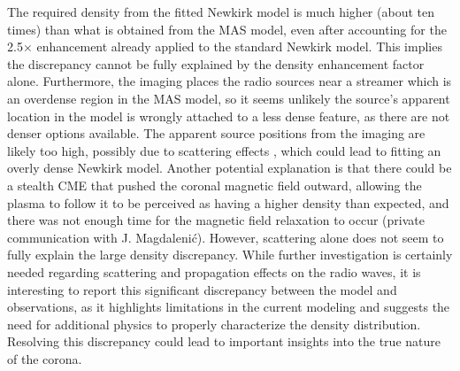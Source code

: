 The required density from the fitted Newkirk model is much higher (about ten times) than what is obtained from the MAS model, even after accounting for the 2.5$\times$ enhancement already applied to the standard Newkirk model. This implies the discrepancy cannot be fully explained by the density enhancement factor alone. Furthermore, the imaging places the radio sources near a streamer which is an overdense region in the MAS model, so it seems unlikely the source's apparent location in the model is wrongly attached to a less dense feature, as there are not denser options available.
The apparent source positions from the imaging are likely too high, possibly due to scattering effects \citep{kontar_2019, kontar_2023, chen_2023}, which could lead to fitting an overly dense Newkirk model. Another potential explanation is that there could be a stealth CME that pushed the coronal magnetic field outward, allowing the plasma to follow it to be perceived as having a higher density than expected, and there was not enough time for the magnetic field relaxation to occur (private communication with J. Magdalenić). However, scattering alone does not seem to fully explain the large density discrepancy. While further investigation is certainly needed regarding scattering and propagation effects on the radio waves, it is interesting to report this significant discrepancy between the model and observations, as it highlights limitations in the current modeling and suggests the need for additional physics to properly characterize the density distribution. Resolving this discrepancy could lead to important insights into the true nature of the corona.

